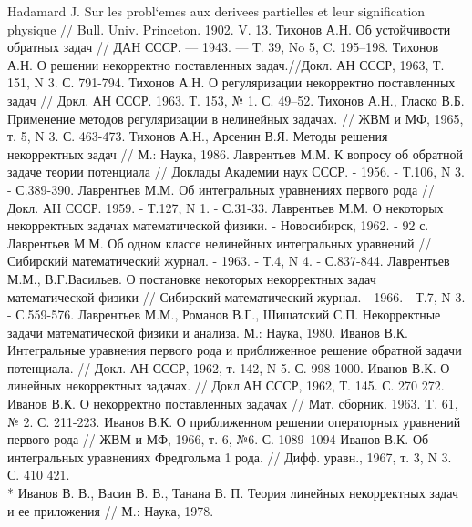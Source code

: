 \documentclass[14pt]{article}
\begin{document}
\begin{thebibliography}{2}
Hadamard J. Sur les probl`emes aux derivees partielles et leur signification physique //  Bull. Univ. Princeton. 1902. V. 13.
 Тихонов А.Н. Об устойчивости обратных задач // ДАН СССР. — 1943. — Т. 39, No 5, C. 195–198.
 Тихонов А.Н. О решении некорректно поставленных задач.//Докл. АН СССР, 1963, Т. 151, N 3. С. 791-794.
 Тихонов А.Н. О регуляризации некорректно поставленных задач // Докл. АН СССР. 1963. Т. 153, № 1. С. 49–52.
 Тихонов А.Н., Гласко В.Б. Применение методов регуляризации в нелинейных задачах. // ЖВМ и МФ, 1965, т. 5, N 3. С. 463-473.
Тихонов А.Н., Арсенин В.Я. Методы решения некорректных задач // М.: Наука, 1986.
Лаврентьев М.М. К вопросу об обратной задаче теории потенциала // Доклады Академии наук СССР. - 1956. - Т.106, N 3. - С.389-390.
Лаврентьев М.М. Об интегральных уравнениях первого рода // Докл. АН СССР. 1959. - Т.127, N 1. - С.31-33.
 Лаврентьев М.М. О некоторых некорректных задачах математической физики. - Новосибирск, 1962. - 92 с.
 Лаврентьев М.М. Об одном классе нелинейных интегральных уравнений // Сибирский математический журнал. - 1963. - Т.4, N 4. - С.837-844.
 Лаврентьев М.М., В.Г.Васильев. О постановке некоторых некорректных задач математической физики // Сибирский математический журнал. - 1966. - Т.7, N 3. - С.559-576.
Лаврентьев  М.М.,  Романов  В.Г.,  Шишатский  С.П.  Некорректные  задачи  математической  физики  и  анализа.  М.:  Наука,  1980.
 Иванов В.К. Интегральные уравнения первого рода и приближенное решение обратной задачи потенциала. // Докл. АН СССР, 1962, т. 142, N 5. С. 998 1000.
 Иванов В.К. О линейных некорректных задачах. // Докл.АН СССР, 1962, Т. 145. С. 270 272.
 Иванов В.К. О некорректно поставленных задачах // Мат. сборник. 1963. T. 61, № 2. С. 211-223.
 Иванов В.К. О приближенном решении операторных уравнений первого рода // ЖВМ и МФ, 1966, т. 6, №6. С. 1089–1094 
  Иванов В.К. Об интегральных уравнениях Фредгольма 1 рода. // Дифф. уравн., 1967, т. 3, N 3. С. 410 421.
\\* Иванов В. В., Васин В. В., Танана В. П. Теория линейных некорректных задач и ее приложения // М.: Наука, 1978.


\end{thebibliography}
\end{document}
